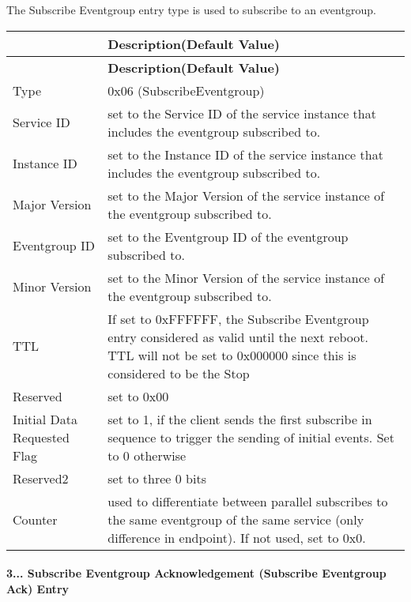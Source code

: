 \begin{DoxyItemize}
\item The Subscribe Eventgroup entry type is used to subscribe to an eventgroup. \tabulinesep=1mm
\begin{longtabu} spread 0pt [c]{*2{|X[-1]}|}
\hline
{}&{\bf Description(\+Default Value)  }\\
\endfirsthead
\hline
\endfoot
\hline
{}&{\bf Description(\+Default Value)  }\\
\endhead
Type &0x06 (Subscribe\+Eventgroup) \\
Service ID &set to the Service ID of the service instance that includes the eventgroup subscribed to. \\
Instance ID &set to the Instance ID of the service instance that includes the eventgroup subscribed to. \\
Major Version &set to the Major Version of the service instance of the eventgroup subscribed to. \\
Eventgroup ID &set to the Eventgroup ID of the eventgroup subscribed to. \\
Minor Version &set to the Minor Version of the service instance of the eventgroup subscribed to. \\
T\+TL &If set to 0x\+F\+F\+F\+F\+FF, the Subscribe Eventgroup entry considered as valid until the next reboot. T\+TL will not be set to 0x000000 since this is considered to be the Stop \\
Reserved &set to 0x00 \\
Initial Data Requested Flag &set to 1, if the client sends the first subscribe in sequence to trigger the sending of initial events. Set to 0 otherwise \\
Reserved2 &set to three 0 bits \\
Counter &used to differentiate between parallel subscribes to the same eventgroup of the same service (only difference in endpoint). If not used, set to 0x0. \\
\end{longtabu}

\end{DoxyItemize}

\paragraph*{3... Subscribe Eventgroup Acknowledgement (Subscribe Eventgroup Ack) Entry}


